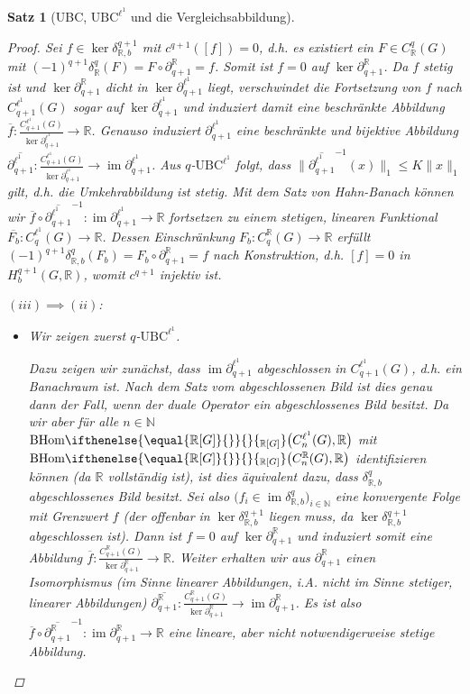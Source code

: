 \documentclass[a4paper,twoside,10pt]{scrreprt}
\DeclareMathOperator{\img}{im}
\newcommand{\N}{\mathbb{N}}
\newcommand{\R}{\mathbb{R}}
\newcommand{\BHom}[2][]{\text{BHom}%
\ifthenelse{\equal{#1}{}}{}{_{#1}}%
\bigl(#2\bigr)}%
\newtheorem{satz}{Satz}[section]
\theoremstyle{definition}
\begin{document}
\begin{satz}[UBC, $\text{UBC}^{\ell^1}$ und die Vergleichsabbildung]
\begin{proof}
Sei $f\in \ker \delta_{\R,b}^{q+1}$ mit $c^{q+1}([f])=0$, d.h. es existiert ein $F\in C_{\R}^q(G)$ mit $(-1)^{q+1}\delta_{\R}^q(F)=F\circ \partial_{q+1}^{\R}=f$. Somit ist $f=0$ auf $\ker \partial_{q+1}^{\R}$. Da $f$ stetig ist und $\ker \partial_{q+1}^{\R}$ dicht in $\ker \partial_{q+1}^{\ell^1}$ liegt, verschwindet die Fortsetzung von $f$ nach $C^{\ell^1}_{q+1}(G)$ sogar auf $\ker \partial_{q+1}^{\ell^1}$ und induziert damit eine beschränkte Abbildung $\overline{f}:\frac{C_{q+1}^{\ell^1}(G)}{\ker \partial_{q+1}^{\ell^1}}\to \R$. Genauso induziert $\partial_{q+1}^{\ell^1}$ eine beschränkte und bijektive Abbildung $\overline{\partial_{q+1}^{\ell^1}}:\frac{C_{q+1}^{\ell^1}(G)}{\ker \partial_{q+1}^{\ell^1}}\to \img \partial_{q+1}^{\ell^1}$. Aus $q$-$\text{UBC}^{\ell^1}$ folgt, dass $\|\overline{\partial_{q+1}^{\ell^1}}^{-1}(x)\|_1\leq K\|x\|_1$ gilt, d.h. die Umkehrabbildung ist stetig. Mit dem Satz von Hahn-Banach können wir $\overline{f}\circ \overline{\partial_{q+1}^{\ell^1}}^{-1}:\img \partial_{q+1}^{\ell^1}\to \R$ fortsetzen zu einem stetigen, linearen Funktional $\overline{F_b}:C_q^{\ell^1}(G)\to \R$. Dessen Einschränkung $F_b:C^{\R}_q(G)\to \R$ erfüllt $(-1)^{q+1}\delta_{\R,b}^q(F_b)=F_b\circ \partial_{q+1}^{\R}=f$ nach Konstruktion, d.h. $[f]=0$ in $H_b^{q+1}(G,\R)$, womit $c^{q+1}$ injektiv ist.\par\noindent
$(iii)\implies (ii)$:
\begin{itemize}
\item Wir zeigen zuerst $q$-$\text{UBC}^{\ell^1}$.\par
Dazu zeigen wir zunächst, dass $\img \partial_{q+1}^{\ell^1}$ abgeschlossen in $C_{q+1}^{\ell^1}(G)$, d.h. ein Banachraum ist. Nach dem Satz vom abgeschlossenen Bild ist dies genau dann der Fall, wenn der duale Operator ein abgeschlossenes Bild besitzt. Da wir aber für alle $n\in \N$ $\BHom[\R{[}G{]}]{C_n^{\ell^1}(G),\R}$ mit $\BHom[\R{[}G{]}]{C_n^{\R}(G),\R}$ identifizieren können (da $\R$ vollständig ist), ist dies äquivalent dazu, dass $\delta_{\R,b}^q$ abgeschlossenes Bild besitzt. Sei also $\bigl(f_i\in \img \delta_{\R,b}^q\bigr)_{i\in \N}$ eine konvergente Folge mit Grenzwert $f$ (der offenbar in $\ker \delta_{\R,b}^{q+1}$ liegen muss, da $\ker \delta_{\R,b}^{q+1}$ abgeschlossen ist). Dann ist $f=0$ auf $\ker \partial_{q+1}^{\R}$ und induziert somit eine Abbildung $\overline{f}:\frac{C_{q+1}^{\R}(G)}{\ker \partial_{q+1}^{\R}}\to \R$. Weiter erhalten wir aus $\partial_{q+1}^{\R}$ einen Isomorphismus (im Sinne linearer Abbildungen, i.A. nicht im Sinne stetiger, linearer Abbildungen) $\overline{\partial_{q+1}^{\R}}:\frac{C_{q+1}^{\R}(G)}{\ker \partial_{q+1}^{\R}}\to \img \partial_{q+1}^{\R}$. Es ist also $\overline{f}\circ\overline{\partial_{q+1}^{\R}}^{-1}:\img \partial_{q+1}^{\R}\to \R$ eine lineare, aber nicht notwendigerweise stetige Abbildung.

\end{itemize}
\end{proof}
\end{satz}
\end{document}

